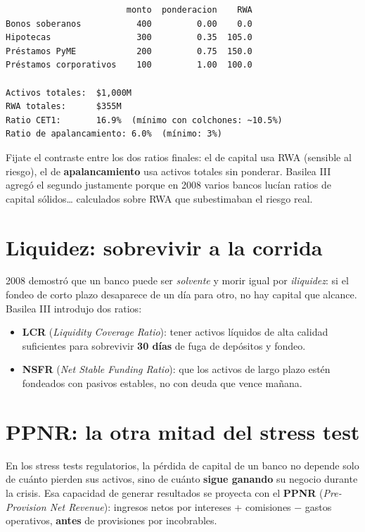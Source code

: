 \documentclass[
  spanish,
  letterpaper,
  DIV=11,
  numbers=noendperiod]{scrreprt}
\providecommand{\tightlist}{%
  \setlength{\itemsep}{0pt}\setlength{\parskip}{0pt}}
\begin{document}
\begin{verbatim}
                        monto  ponderacion    RWA
Bonos soberanos           400         0.00    0.0
Hipotecas                 300         0.35  105.0
Préstamos PyME            200         0.75  150.0
Préstamos corporativos    100         1.00  100.0

Activos totales:  $1,000M
RWA totales:      $355M
Ratio CET1:       16.9%  (mínimo con colchones: ~10.5%)
Ratio de apalancamiento: 6.0%  (mínimo: 3%)
\end{verbatim}

Fijate el contraste entre los dos ratios finales: el de capital usa RWA
(sensible al riesgo), el de \textbf{apalancamiento} usa activos totales
sin ponderar. Basilea III agregó el segundo justamente porque en 2008
varios bancos lucían ratios de capital sólidos\ldots{} calculados sobre
RWA que subestimaban el riesgo real.

\section{Liquidez: sobrevivir a la
corrida}\label{liquidez-sobrevivir-a-la-corrida}

2008 demostró que un banco puede ser \emph{solvente} y morir igual por
\emph{iliquidez}: si el fondeo de corto plazo desaparece de un día para
otro, no hay capital que alcance. Basilea III introdujo dos ratios:

\begin{itemize}
\tightlist
\item
  \textbf{LCR} (\emph{Liquidity Coverage Ratio}): tener activos líquidos
  de alta calidad suficientes para sobrevivir \textbf{30 días} de fuga
  de depósitos y fondeo.
\item
  \textbf{NSFR} (\emph{Net Stable Funding Ratio}): que los activos de
  largo plazo estén fondeados con pasivos estables, no con deuda que
  vence mañana.
\end{itemize}

\section{PPNR: la otra mitad del stress
test}\label{ppnr-la-otra-mitad-del-stress-test}

En los stress tests regulatorios, la pérdida de capital de un banco no
depende solo de cuánto pierden sus activos, sino de cuánto \textbf{sigue
ganando} su negocio durante la crisis. Esa capacidad de generar
resultados se proyecta con el \textbf{PPNR} (\emph{Pre-Provision Net
Revenue}): ingresos netos por intereses + comisiones − gastos
operativos, \textbf{antes} de provisiones por incobrables.
\end{document}
